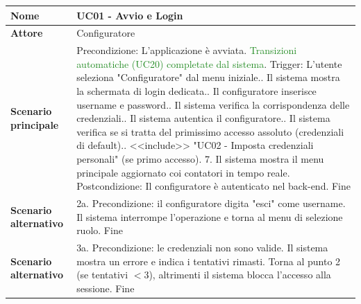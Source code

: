 \documentclass[12pt, a4paper, oneside]{report}
\begin{document}
\begin{table}[htbp]
    \centering
    \renewcommand{\arraystretch}{1.4} 
    \begin{tabularx}{\textwidth}{|l|X|}
    \hline
    \textbf{Nome}               & \textbf{UC01 - Avvio e Login} \\ \hline
    \textbf{Attore}             & Configuratore \\ \hline
    \textbf{Scenario principale} & 
    Precondizione: L'applicazione è avviata. \textcolor{ForestGreen}{Transizioni automatiche (UC20) completate dal sistema}.\newline
    Trigger: L'utente seleziona "Configuratore" dal menu iniziale.\newline
    1. Il sistema mostra la schermata di login dedicata.\newline
    2. Il configuratore inserisce username e password.\newline
    3. Il sistema verifica la corrispondenza delle credenziali.\newline
    4. Il sistema autentica il configuratore.\newline
    5. Il sistema verifica se si tratta del primissimo accesso assoluto (credenziali di default).\newline
    6. <<include>> "UC02 - Imposta credenziali personali" (se primo accesso).\newline
    \textcolor{BurntOrange}{7. Il sistema mostra il menu principale aggiornato coi contatori in tempo reale}.\newline
    Postcondizione: Il configuratore è autenticato nel back-end.\newline
    Fine \\ \hline
    \textbf{Scenario alternativo} & 
    2a. Precondizione: il configuratore digita "esci" come username.\newline
    Il sistema interrompe l'operazione e torna al menu di selezione ruolo.\newline
    Fine \\ \hline
    \textbf{Scenario alternativo} & 
    3a. Precondizione: le credenziali non sono valide.\newline
    Il sistema mostra un errore e indica i tentativi rimasti.\newline
    Torna al punto 2 (se tentativi $< 3$), altrimenti il sistema blocca l'accesso alla sessione.\newline
    Fine \\ \hline
    \end{tabularx}
    \label{tab:uc01_v3}
\end{table}
\end{document}
